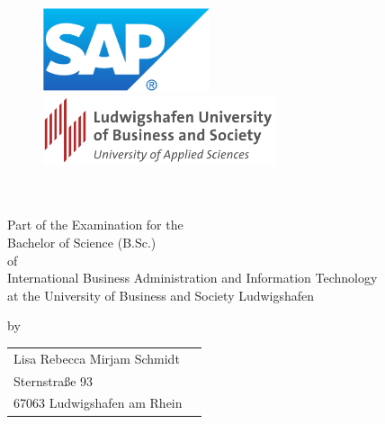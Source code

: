 \thispagestyle{empty}
\begin{titlepage}
\enlargethispage{4cm}

\begin{figure}           %
	\vspace*{-5mm} %
	\begin{minipage}{0.49\textwidth}
		\flushleft
		\includegraphics[height=2.5cm]{Bilder/Logos/Logo_SAP.pdf} 
	\end{minipage}
	\hfill
	\begin{minipage}{0.49\textwidth}
		
		\includegraphics[height=2cm]{Bilder/Logos/Logo_HWGLU.png} 
	\end{minipage}
	\hfill
\end{figure} 
\vspace*{0.1cm}

\begin{center}
	\huge{\textbf{\titel}}\\[1.5cm]
	\Large{\textbf{\arbeit}}\\[1cm]
	\normalsize{Part of the Examination for the \\[0.2cm]Bachelor of Science (B.Sc.)\\[0.2cm] of \\[0.2cm]}
	\normalsize{International Business Administration and Information Technology}\\[0.2cm]
	\normalsize{at the University of Business and Society Ludwigshafen}\\[2cm]
	
\end{center}

\begin{center}
	\vfill
	\normalsize{by}\\[0.5cm]
	\begin{tabular}{ll}
		Lisa Rebecca Mirjam Schmidt                   \\[0.2cm]
		Sternstraße 93  \\[0.2cm]
		67063 Ludwigshafen am Rhein\\[2cm]
	\end{tabular} 
\end{center}


\end{titlepage}

